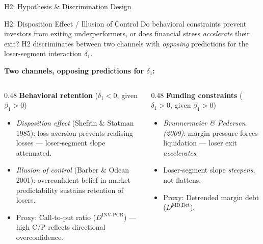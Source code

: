 \documentclass[10pt, aspectratio=169]{beamer}
\begin{document}
\begin{frame}{H2: Hypothesis \& Discrimination Design}
  \begin{block}{H2: Disposition Effect / Illusion of Control}
    \small Do behavioral constraints prevent investors from exiting underperformers,
    or does financial stress \emph{accelerate} their exit? H2 discriminates between
    two channels with \emph{opposing} predictions for the loser-segment interaction $\delta_1$.
  \end{block}
  \vspace{2pt}
  \small\textbf{Two channels, opposing predictions for $\delta_1$:}
  \vspace{2pt}
  \begin{columns}[T]
    \begin{column}{0.48\textwidth}
      \textbf{Behavioral retention} ($\delta_1 < 0$, given $\beta_1 > 0$)
      \begin{itemize}\itemsep1pt
        \item \textit{Disposition effect} (Shefrin \& Statman 1985):
              loss aversion prevents realising losses — loser-segment slope attenuated.
        \item \textit{Illusion of control} (Barber \& Odean 2001):
              overconfident belief in market predictability sustains retention of losers.
        \item Proxy: Call-to-put ratio ($D^{\text{INV-PCR}}$) — high C/P reflects
              directional overconfidence.
      \end{itemize}
    \end{column}
    \begin{column}{0.48\textwidth}
      \textbf{Funding constraints} ($\delta_1 > 0$, given $\beta_1 > 0$)
      \begin{itemize}\itemsep1pt
        \item \textit{Brunnermeier \& Pedersen (2009)}: margin pressure forces
              liquidation — loser exit \emph{accelerates}.
        \item Loser-segment slope \emph{steepens}, not flattens.
        \item Proxy: Detrended margin debt ($D^{\text{MD,Det}}$).
      \end{itemize}
    \end{column}
  \end{columns}
\end{frame}
\end{document}
